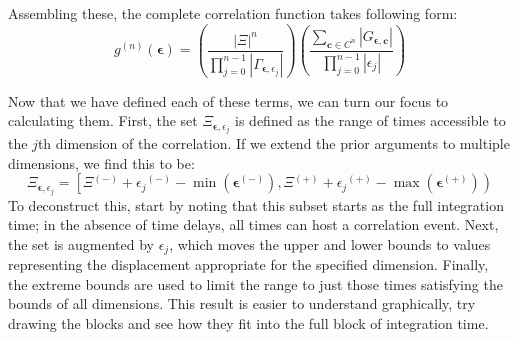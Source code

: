 \documentclass{article}
\newcommand{\parens}[1]{\ensuremath{\left( #1 \right)}}
\newcommand{\gn}[1]{\ensuremath{g^{(#1)}}}
\renewcommand{\vec}{\boldsymbol}
\newcommand{\abs}[1]{\ensuremath{\left|#1\right|}}
\newcommand{\channel}{\ensuremath{c}}
\newcommand{\channels}{\ensuremath{C}}
\newcommand{\photons}{\ensuremath{\Gamma}}
\newcommand{\integrationtime}{\ensuremath{\Xi}}
\newcommand{\resolution}{\ensuremath{\epsilon}}
\newcommand{\correlationset}{\ensuremath{G}}
\newcommand{\upplus}{\ensuremath{^{(+)}}}
\newcommand{\upminus}{\ensuremath{^{(-)}}}
\begin{document}
Assembling these, the complete correlation function takes following form:
\begin{equation}
\label{eq:gn_full}
\gn{n}\parens{\vec{\resolution}} = \parens{\frac{\abs{\integrationtime}^{n}}
                                                {\prod_{j=0}^{n-1}
                                                       {\abs{\photons_{
                                                                 \vec{\resolution},
                                                                 \resolution_{j}}}}}}
                            \parens{\frac{\sum_{\vec{\channel}\in\channels^{n}}
                                               {\abs{\correlationset_{\vec{\resolution},
                                                                      \vec{\channel}}}}}
                                         {\prod_{j=0}^{n-1}{\abs{\resolution_{j}}}}}
\end{equation}

Now that we have defined each of these terms, we can turn our focus to calculating them. First, the set $\integrationtime_{\vec{\resolution},\resolution_{j}}$ is defined as the range of times accessible to the $j$th dimension of the correlation. If we extend the prior arguments to multiple dimensions, we find this to be:
\begin{equation}
\integrationtime_{\vec{\resolution},\resolution_{j}} = 
   \left[
   \integrationtime\upminus + \resolution_{j}\upminus - \min{\parens{\vec{\resolution}\upminus}},
   \integrationtime\upplus + \resolution_{j}\upplus - \max{\parens{\vec{\resolution}\upplus}}
   \right)
\end{equation}
To deconstruct this, start by noting that this subset starts as the full integration time; in the absence of time delays, all times can host a correlation event. Next, the set is augmented by $\resolution_{j}$, which moves the upper and lower bounds to values representing the displacement appropriate for the specified dimension. Finally, the extreme bounds are used to limit the range to just those times satisfying the bounds of all dimensions. This result is easier to understand graphically, try drawing the blocks and see how they fit into the full block of integration time.
\end{document}
